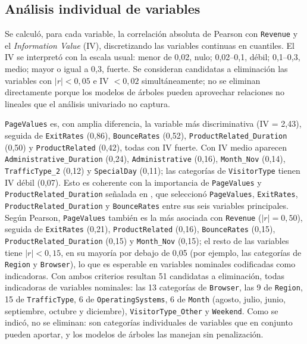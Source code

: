 \documentclass[conference]{IEEEtran}
\begin{document}
\subsection{Análisis individual de variables}
Se calculó, para cada variable, la correlación absoluta de Pearson con \texttt{Revenue} y el \emph{Information Value} (IV), discretizando las variables continuas en cuantiles. El IV se interpretó con la escala usual: menor de 0,02, nulo; 0,02--0,1, débil; 0,1--0,3, medio; mayor o igual a 0,3, fuerte. Se consideran candidatas a eliminación las variables con $|r|<0{,}05$ e IV $<0{,}02$ simultáneamente; no se eliminan directamente porque los modelos de árboles pueden aprovechar relaciones no lineales que el análisis univariado no captura.

\texttt{PageValues} es, con amplia diferencia, la variable más discriminativa (IV = 2,43), seguida de \texttt{ExitRates} (0,86), \texttt{BounceRates} (0,52), \texttt{ProductRelated\_Duration} (0,50) y \texttt{ProductRelated} (0,42), todas con IV fuerte. Con IV medio aparecen \texttt{Administrative\_Duration} (0,24), \texttt{Administrative} (0,16), \texttt{Month\_Nov} (0,14), \texttt{TrafficType\_2} (0,12) y \texttt{SpecialDay} (0,11); las categorías de \texttt{VisitorType} tienen IV débil (0,07). Esto es coherente con la importancia de \texttt{PageValues} y \texttt{ProductRelated\_Duration} señalada en \cite{alamuri2026}, que seleccionó \texttt{PageValues}, \texttt{ExitRates}, \texttt{ProductRelated\_Duration} y \texttt{BounceRates} entre sus seis variables principales. Según Pearson, \texttt{PageValues} también es la más asociada con \texttt{Revenue} ($|r|=0{,}50$), seguida de \texttt{ExitRates} (0,21), \texttt{ProductRelated} (0,16), \texttt{BounceRates} (0,15), \texttt{ProductRelated\_Duration} (0,15) y \texttt{Month\_Nov} (0,15); el resto de las variables tiene $|r|<0{,}15$, en su mayoría por debajo de 0,05 (por ejemplo, las categorías de \texttt{Region} y \texttt{Browser}), lo que es esperable en variables nominales codificadas como indicadoras. Con ambos criterios resultan 51 candidatas a eliminación, todas indicadoras de variables nominales: las 13 categorías de \texttt{Browser}, las 9 de \texttt{Region}, 15 de \texttt{TrafficType}, 6 de \texttt{OperatingSystems}, 6 de \texttt{Month} (agosto, julio, junio, septiembre, octubre y diciembre), \texttt{VisitorType\_Other} y \texttt{Weekend}. Como se indicó, no se eliminan: son categorías individuales de variables que en conjunto pueden aportar, y los modelos de árboles las manejan sin penalización.
\end{document}
